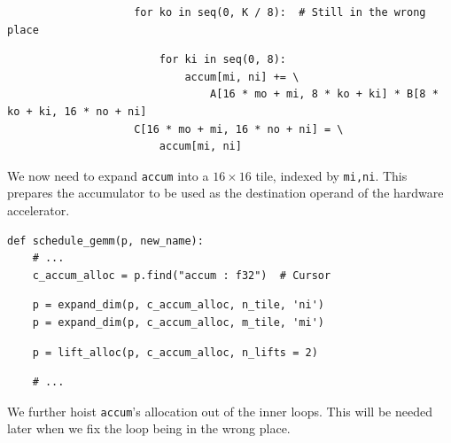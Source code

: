 \begin{minipage}[t]{0.6\textwidth}
\begin{mdframed}[style=MyFrame, backgroundcolor=violetBoxBg]
\color{violetBoxFg}
\begin{verbatim}
                    for ko in seq(0, K / 8):  # Still in the wrong place
\end{verbatim}
\end{mdframed}
\begin{verbatim}
                        for ki in seq(0, 8):
                            accum[mi, ni] += \
                                A[16 * mo + mi, 8 * ko + ki] * B[8 * ko + ki, 16 * no + ni]
                    C[16 * mo + mi, 16 * no + ni] = \
                        accum[mi, ni]
\end{verbatim}
\end{minipage}
\hfill
\begin{minipage}[t]{0.4\textwidth}\codeminipage
We now need to expand \texttt{accum} into a $16 \times 16$ tile, indexed by \texttt{mi,ni}.
This prepares the accumulator to be used as the destination operand of the hardware accelerator.
\vspace{6mm}
{
\tiny
\begin{verbatim}
def schedule_gemm(p, new_name):
    # ...
    c_accum_alloc = p.find("accum : f32")  # Cursor
\end{verbatim}
\begin{mdframed}[style=MyFrame, backgroundcolor=yellowBoxBg]
\color{yellowBoxFg}
\begin{verbatim}
    p = expand_dim(p, c_accum_alloc, n_tile, 'ni')
    p = expand_dim(p, c_accum_alloc, m_tile, 'mi')
\end{verbatim}
\end{mdframed}
\begin{mdframed}[style=MyFrame, backgroundcolor=blueBoxBg]
\color{blueBoxFg}
\begin{verbatim}
    p = lift_alloc(p, c_accum_alloc, n_lifts = 2)
\end{verbatim}
\end{mdframed}
\begin{verbatim}
    # ...
\end{verbatim}
}
\vspace{6mm}
We further hoist \texttt{accum}'s allocation out of the inner loops.
This will be needed later when we fix the  loop being in the wrong place.
\end{minipage}

\newpage
{}

